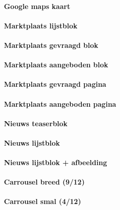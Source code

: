 \paragraph{Google maps kaart}

\paragraph{Marktplaats lijstblok}

\paragraph{Marktplaats gevraagd blok}

\paragraph{Marktplaats aangeboden blok}

\paragraph{Marktplaats gevraagd pagina}

\paragraph{Marktplaats aangeboden pagina}

\paragraph{Nieuws teaserblok}

\paragraph{Nieuws lijstblok}

\paragraph{Nieuws lijstblok + afbeelding}

\paragraph{Carrousel breed (9/12)}

\paragraph{Carrousel smal (4/12)}


